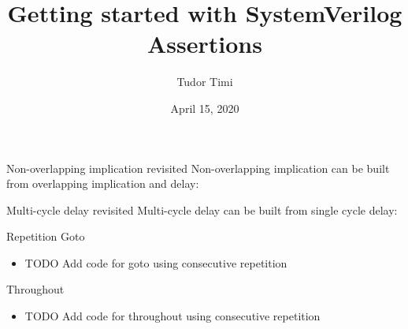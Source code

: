 \documentclass{beamer}
\title{Getting started with SystemVerilog Assertions}
\author{Tudor Timi}
\institute{VerificationGentleman.com}
\date{April 15, 2020}
\begin{document}
\begin{frame}[fragile]{Non-overlapping implication revisited}
Non-overlapping implication can be built from overlapping implication and delay:

\pause
{}

\pause
{}

\pause
{}
\end{frame}


\begin{frame}[fragile]{Multi-cycle delay revisited}
Multi-cycle delay can be built from single cycle delay:

\pause
{}
\end{frame}


\begin{frame}{Repetition}
Goto

\begin{itemize}
 \item TODO Add code for goto using consecutive repetition
\end{itemize}
\end{frame}


\begin{frame}{Throughout}
\begin{itemize}
 \item TODO Add code for throughout using consecutive repetition
\end{itemize}
\end{frame}
\end{document}
